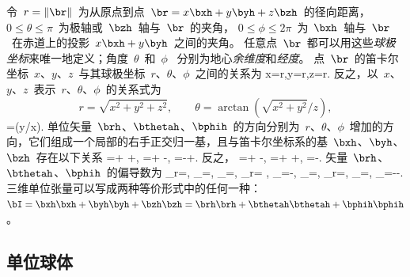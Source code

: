 令~$r=\|\br\|$~为从原点到点~$\br=x\bxh+y\byh+z\bzh$~的径向距离，
$0\leq \theta\leq\pi$~为极轴或~$\bzh$~轴与~$\br$~的夹角， 
$0\leq \phi\leq 2\pi$~为~$\bxh$~轴与~$\br$~在赤道上的投影~$x\bxh+y\byh$~之间的夹角。
任意点~$\br$~都可以用这些{\em 球极坐标\/}来唯一地定义；角度~$\theta$~和~$\phi$~ 分别为地心{\em 余维度\/}和{\em 经度\/}。
%
%
点~$\br$~的笛卡尔坐标~$x$、$y$、$z$~与其球极坐标~$r$、$\theta$、$\phi$~之间的关系为
\eq \label{A.xyzrtp}
x=r\sin\theta\cos\phi,\qquad y=r\sin\theta\sin\phi,\qquad z=r\cos\theta.
\en
反之，以~$x$、$y$、$z$~表示~$r$、$\theta$、$\phi$~的关系式为
\begin{displaymath}
r=\sqrt{x^2+y^2+z^2},\qquad\theta=\arctan(\sqrt{x^2+y^2}/z),
\end{displaymath}
\eq
\qquad\qquad\qquad\phi=\arctan(y/x).
\en
单位矢量~$\brh$、$\bthetah$、$\bphih$~的方向分别为~$r$、$\theta$、$\phi$~增加的方向，它们组成一个局部的右手正交归一基，且与笛卡尔坐标系的基~$\bxh$、$\byh$、$\bzh$~存在以下关系
\eq \label{A.needinC}
\brh=\bxh\sin\theta\cos\phi+\byh\sin\theta\sin\phi
+\bzh\cos\theta,
\en
\eq \label{A.need1}
\bthetah=\bxh\cos\theta\cos\phi+\byh\cos\theta\sin\phi
-\bzh\sin\theta,
\en
\eq \label{A.need2}
\bphih=-\bxh\sin\phi+\byh\cos\phi.
\en
反之，
\eq
\bxh=\brh\sin\theta\cos\phi+\bthetah\cos\theta\cos\phi
-\bphih\sin\phi,
\en
\eq
\byh=\brh\sin\theta\sin\phi+\bthetah\cos\theta\sin\phi
+\bphih\cos\phi,
\en
\eq
\bzh=\brh\cos\theta-\bthetah\sin\theta.
\en
矢量~$\brh$、$\bthetah$、$\bphih$~的偏导数为
\eq
\p_r\brh=\bzero,\qquad
\p_{\theta}\brh=\bthetah,\qquad
\p_{\phi}\brh=\bphih\sin\theta,
\en
\eq
\p_r\bthetah=
\bzero,\qquad
\p_{\theta}\bthetah=-\brh,\qquad
\p_{\phi}\bthetah=\bphih\cos\theta,
\en
\eq
\p_r\bphih=\bzero,\qquad
\p_{\theta}\bphih=\bzero,\qquad
\p_{\phi}\bphih=-\brh\sin\theta-\bthetah\cos\theta.
\en
三维单位张量可以写成两种等价形式中的任何一种：$\bI=\bxh\bxh
+\byh\byh+\bzh\bzh=\brh\brh+\bthetah\bthetah+\bphih\bphih$。
%

\subsection{单位球体}
%

